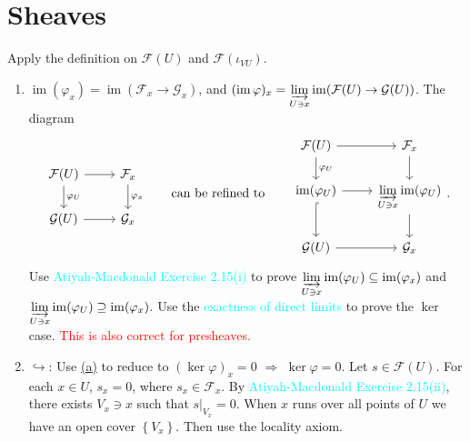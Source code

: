 \section{Sheaves}

\begin{exercise}\label{ex1.1}
	Apply the definition on $\mathcal{F}(U)$ and $\mathcal{F}\!\left(\iota_{VU}\right)$.
\end{exercise}

\begin{exercise}\label{ex1.2}
	\begin{enumerate}[label=(\alph*),ref=\theexercise(\alph*)]
		\item\label{ex1.2.1} $\operatorname{im}\!\left(\varphi_x\right)=\operatorname{im}\!\left(\mathcal{F}_x\rightarrow\mathcal{G}_x\right)$, and $(\operatorname{im}\varphi)_x=\displaystyle\varinjlim_{U\ni x}\operatorname{im}\!\left(\mathcal{F}(U)\rightarrow\mathcal{G}(U)\right)$. The diagram
		\begin{equation*}
			\begin{tikzcd}
				\mathcal{F}(U)\arrow[r]\arrow[d,"\varphi_U"]&\mathcal{F}_x\arrow[d,"\varphi_x"]\\
				\mathcal{G}(U)\arrow[r]&\mathcal{G}_x
			\end{tikzcd}
			\qquad\text{can be refined to}\qquad
			\begin{tikzcd}
				\mathcal{F}(U)\arrow[r]\arrow[d,"\varphi_U"]&\mathcal{F}_x\arrow[d]\\
				\operatorname{im}\!\left(\varphi_U\right)\arrow[r]\arrow[d,hook]&\displaystyle\varinjlim_{U\ni x}\operatorname{im}\!\left(\varphi_U\right)\arrow[d]\\
				\mathcal{G}(U)\arrow[r]&\mathcal{G}_x
			\end{tikzcd}.
		\end{equation*}
		Use \textcolor{cyan}{Atiyah-Macdonald Exercise 2.15(i)} to prove $\displaystyle\varinjlim_{U\ni x}\operatorname{im}\!\left(\varphi_U\right)\subseteq\operatorname{im}\!\left(\varphi_x\right)$ and $\displaystyle\varinjlim_{U\ni x}\operatorname{im}\!\left(\varphi_U\right)\supseteq\operatorname{im}\!\left(\varphi_x\right)$. Use the \textcolor{cyan}{exactness of direct limits} to prove the $\ker$ case. \textcolor{red}{This is also correct for presheaves.}
		\item\label{ex1.2.2} $\hookrightarrow$: Use \hyperref[ex1.2.1]{(a)} to reduce to $(\ker\varphi)_x=0$ $\Rightarrow$ $\ker\varphi=0$. Let $s\in\mathcal{F}(U)$. For each $x\in U$, $s_x=0$, where $s_x\in\mathcal{F}_x$. By \textcolor{cyan}{Atiyah-Macdonald Exercise 2.15(ii)}, there exists $V_x\ni x$ such that $s|_{V_x}=0$. When $x$ runs over all points of $U$ we have an open cover $\left\{V_x\right\}$. Then use the locality axiom.
		

\end{enumerate}
\end{exercise}

